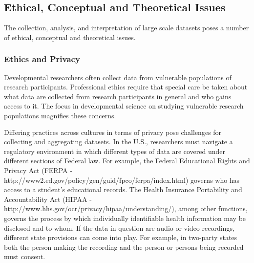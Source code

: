 \documentclass[letterpaper,man,apacite]{apa6}
\begin{document}
\subsection{Ethical, Conceptual and Theoretical Issues}

The collection, analysis, and interpretation of large scale datasets poses a number of ethical, conceptual and theoretical issues.

\subsubsection{Ethics and Privacy}

Developmental researchers often collect data from vulnerable populations of research participants.
Professional ethics require that special care be taken about what data are collected from research participants in general and who gains access to it.
The focus in developmental science on studying vulnerable research populations magnifies these concerns.

Differing practices across cultures in terms of privacy pose challenges for collecting and aggregating datasets.
In the U.S., researchers must navigate a regulatory environment in which different types of data are covered under different sections of Federal law.
For example, the Federal Educational Rights and Privacy Act (FERPA - http://www2.ed.gov/policy/gen/guid/fpco/ferpa/index.html) governs who has access to a student's educational records.
The Health Insurance Portability and Accountability Act (HIPAA - http://www.hhs.gov/ocr/privacy/hipaa/understanding/), among other functions, governs the process by which individually identifiable health information may be disclosed and to whom.
If the data in question are audio or video recordings, different state provisions can come into play.
For example, in two-party states \cite{http://www.dmlp.org/legal-guide/recording-phone-calls-and-conversations} both the person making the recording and the person or persons being recorded must consent.
\end{document}
